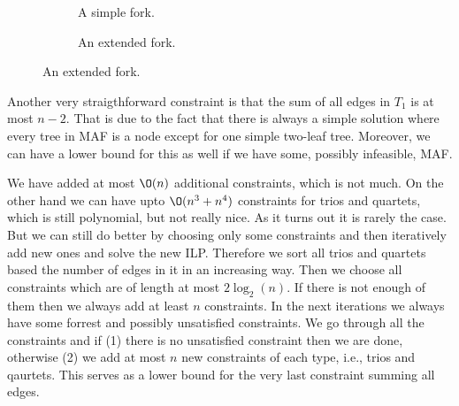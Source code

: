 \documentclass{article}
\theoremstyle{plain}
\theoremstyle{definition}
\begin{document}
  \begin{figure}[!ht]\centering
    \begin{subfigure}{.45\textwidth}\centering
      \caption{A simple fork.}\label{fig:fork}
    \end{subfigure}
    \begin{subfigure}{.45\textwidth}\centering
      \caption{An extended fork.}\label{fig:extended-fork}
    \end{subfigure}
  \end{figure}

  Another very straigthforward constraint is that the sum of all edges in $T_1$ is at most $n-2$. That is
  due to the fact that there is always a simple solution where every tree in MAF is a node except for
  one simple two-leaf tree. Moreover, we can have a lower bound for this as well if we have some, possibly
  infeasible, MAF.

  We have added at most $\O(n)$ additional constraints, which is not much. On the other hand we can have
  upto $\O(n^3 + n^4)$ constraints for trios and quartets, which is still polynomial, but not really nice.
  As it turns out it is rarely the case. But we can still do better by choosing only some constraints
  and then iteratively add new ones and solve the new ILP. Therefore we sort all trios and quartets based
  the number of edges in it in an increasing way. Then we choose all constraints which are of length
  at most $2 \log_2(n)$. If there is not enough of them then we always add at least $n$ constraints.
  In the next iterations we always have some forrest and possibly unsatisfied constraints. We go through
  all the constraints and if (1) there is no unsatisfied constraint then we are done, otherwise (2) we
  add at most $n$ new constraints of each type, i.e., trios and qaurtets. This serves as a lower bound
  for the very last constraint summing all edges.

  
  
\end{document}
